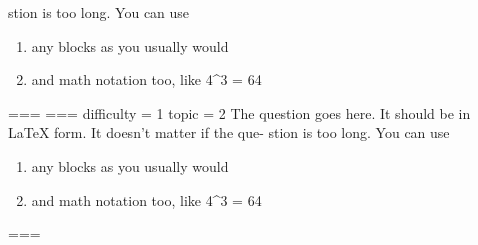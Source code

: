 stion is too long. You can use
\begin{enumerate}
    \item any blocks as you usually would
    \item and math notation too, like 4^3 = 64
\end{enumerate}
===
===
difficulty = 1
topic = 2
The question goes here. It should be in LaTeX form. It doesn't matter if the que-
stion is too long. You can use
\begin{enumerate}
    \item any blocks as you usually would
    \item and math notation too, like 4^3 = 64
\end{enumerate}
===
